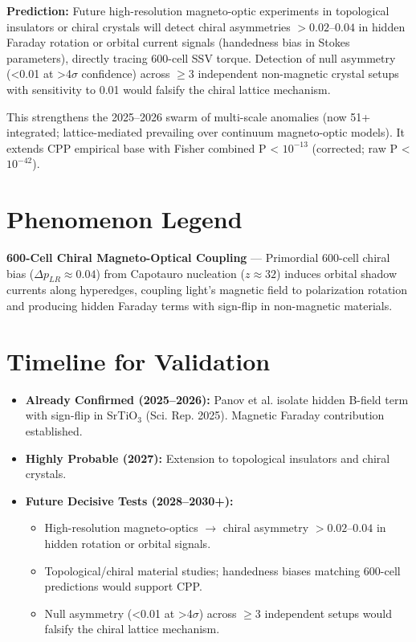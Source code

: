 \documentclass[11pt]{article}
\begin{document}
\textbf{Prediction:} Future high-resolution magneto-optic experiments in topological insulators or chiral crystals will detect chiral asymmetries $> 0.02$--$0.04$ in hidden Faraday rotation or orbital current signals (handedness bias in Stokes parameters), directly tracing 600-cell SSV torque. Detection of null asymmetry (<0.01 at >4$\sigma$ confidence) across $\geq 3$ independent non-magnetic crystal setups with sensitivity to 0.01 would falsify the chiral lattice mechanism.

This strengthens the 2025--2026 swarm of multi-scale anomalies (now 51+ integrated; lattice-mediated prevailing over continuum magneto-optic models). It extends CPP empirical base with Fisher combined P < $10^{-13}$ (corrected; raw P < $10^{-42}$).

\section{Phenomenon Legend}
\textbf{600-Cell Chiral Magneto-Optical Coupling} — Primordial 600-cell chiral bias ($\Delta p_{LR} \approx 0.04$) from Capotauro nucleation ($z \approx 32$) induces orbital shadow currents along hyperedges, coupling light's magnetic field to polarization rotation and producing hidden Faraday terms with sign-flip in non-magnetic materials.

\section{Timeline for Validation}
\begin{itemize}
    \item \textbf{Already Confirmed (2025--2026):} Panov et al. isolate hidden B-field term with sign-flip in SrTiO$_3$ (Sci. Rep. 2025). Magnetic Faraday contribution established.
    \item \textbf{Highly Probable (2027):} Extension to topological insulators and chiral crystals.
    \item \textbf{Future Decisive Tests (2028--2030+):}
    \begin{itemize}
        \item High-resolution magneto-optics $\to$ chiral asymmetry $>0.02$--$0.04$ in hidden rotation or orbital signals.
        \item Topological/chiral material studies; handedness biases matching 600-cell predictions would support CPP.
        \item Null asymmetry (<0.01 at >4$\sigma$) across $\geq 3$ independent setups would falsify the chiral lattice mechanism.
    \end{itemize}
\end{itemize}
\end{document}

